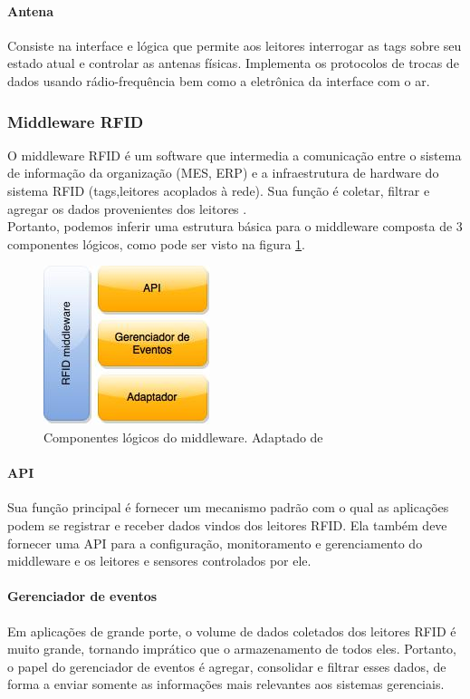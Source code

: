 	\paragraph{Antena} Consiste na interface e lógica que permite aos leitores interrogar as tags sobre seu estado atual e controlar as antenas físicas. Implementa os protocolos de trocas de dados usando rádio-frequência bem como a eletrônica da interface com o ar.

	
	\subsubsection{Middleware RFID}
	
	O middleware RFID é um software que intermedia a comunicação entre o sistema de informação da organização (MES, ERP) e a infraestrutura de hardware do sistema RFID (tags,leitores acoplados à rede). Sua função é coletar, filtrar e agregar os dados provenientes dos leitores \cite{renatarfid}. \\
	Portanto, podemos inferir uma estrutura básica para o middleware composta de 3 componentes lógicos, como pode ser visto na figura \ref{fig:middleware}.
		
		\begin{figure}[h!]
			\centering
			\includegraphics[width=0.25\linewidth]{middleware}
			\caption{Componentes lógicos do middleware. Adaptado de \cite{rfidbook}}
			\label{fig:middleware}
		\end{figure}
	
	\paragraph{API} Sua função principal é fornecer um mecanismo padrão com o qual as aplicações podem se registrar e receber dados vindos dos leitores RFID. Ela também deve fornecer uma API para a configuração, monitoramento e gerenciamento do middleware e os leitores e sensores controlados por ele.
	\paragraph{Gerenciador de eventos} Em aplicações de grande porte, o volume de dados coletados dos leitores RFID é muito grande, tornando imprático que o armazenamento de todos eles. Portanto, o papel do gerenciador de eventos é agregar, consolidar e filtrar esses dados, de forma a enviar somente as informações mais relevantes aos sistemas gerenciais.

